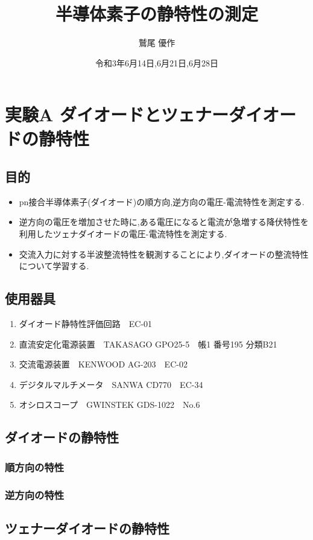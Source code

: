 \documentclass[titlepage]{jarticle}
\title{半導体素子の静特性の測定}
\author{鷲尾 優作}
\date{令和3年6月14日,6月21日,6月28日}
\begin{document}
\maketitle

\tableofcontents
\newpage

\section{実験A ダイオードとツェナーダイオードの静特性}
\subsection{目的}
\begin{itemize}
    \item pn接合半導体素子(ダイオード)の順方向,逆方向の電圧-電流特性を測定する.
    \item 逆方向の電圧を増加させた時に,ある電圧になると電流が急増する降伏特性を利用したツェナダイオードの電圧-電流特性を測定する.
    \item 交流入力に対する半波整流特性を観測することにより,ダイオードの整流特性について学習する.
\end{itemize}
\subsection{使用器具}
\begin{enumerate}
    \item ダイオード静特性評価回路　EC-01
    \item 直流安定化電源装置　TAKASAGO GPO25-5　帳1 番号195 分類B21
    \item 交流電源装置　KENWOOD AG-203　EC-02
    \item デジタルマルチメータ　SANWA CD770　EC-34
    \item オシロスコープ　GWINSTEK GDS-1022　No.6
\end{enumerate}
\subsection{ダイオードの静特性}
\subsubsection{順方向の特性}
\subsubsection{逆方向の特性}
\subsection{ツェナーダイオードの静特性}
\end{document}

